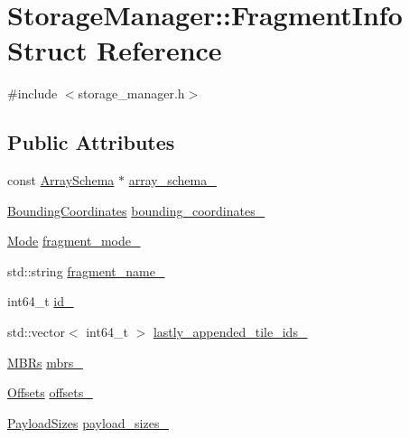 \hypertarget{structStorageManager_1_1FragmentInfo}{}\section{Storage\+Manager\+:\+:Fragment\+Info Struct Reference}
\label{structStorageManager_1_1FragmentInfo}


{\ttfamily \#include $<$storage\+\_\+manager.\+h$>$}

\subsection*{Public Attributes}
\begin{DoxyCompactItemize}
\item 
const \hyperlink{classArraySchema}{Array\+Schema} $\ast$ \hyperlink{structStorageManager_1_1FragmentInfo_ac2b6b9541f3333e4c3531249b011fa18}{array\+\_\+schema\+\_\+}
\item 
\hyperlink{classStorageManager_ab527f4f911acfefc5c92ecaddec41300}{Bounding\+Coordinates} \hyperlink{structStorageManager_1_1FragmentInfo_aac30cfa70d7b2abf6dcfcc99e8a36403}{bounding\+\_\+coordinates\+\_\+}
\item 
\hyperlink{classStorageManager_a954978f012ace347debd73b2a461a618}{Mode} \hyperlink{structStorageManager_1_1FragmentInfo_aa90cf062cb0ea543bd709c48308d41e2}{fragment\+\_\+mode\+\_\+}
\item 
std\+::string \hyperlink{structStorageManager_1_1FragmentInfo_a6e042a16573de3d5642567bc6e669ecc}{fragment\+\_\+name\+\_\+}
\item 
int64\+\_\+t \hyperlink{structStorageManager_1_1FragmentInfo_a602707f31dd459f7618a763c7fdff48c}{id\+\_\+}
\item 
std\+::vector$<$ int64\+\_\+t $>$ \hyperlink{structStorageManager_1_1FragmentInfo_a850dbb6c8f3f044893ea04d314125e05}{lastly\+\_\+appended\+\_\+tile\+\_\+ids\+\_\+}
\item 
\hyperlink{classStorageManager_a09f09fbac76952a268f77ac049da4070}{M\+B\+Rs} \hyperlink{structStorageManager_1_1FragmentInfo_a9d9ff5f675b9c61b5cd3d995d6d964d3}{mbrs\+\_\+}
\item 
\hyperlink{classStorageManager_a92535a9b1da2da9098d241c0ea6e1bea}{Offsets} \hyperlink{structStorageManager_1_1FragmentInfo_a676e54c719212948c1e58ce5b1d01a0d}{offsets\+\_\+}
\item 
\hyperlink{classStorageManager_a441e5143f57bd782fb8c153b6fcef8d1}{Payload\+Sizes} \hyperlink{structStorageManager_1_1FragmentInfo_a733686e314b164d8feb9a450d94d7493}{payload\+\_\+sizes\+\_\+}

\end{DoxyCompactItemize}
